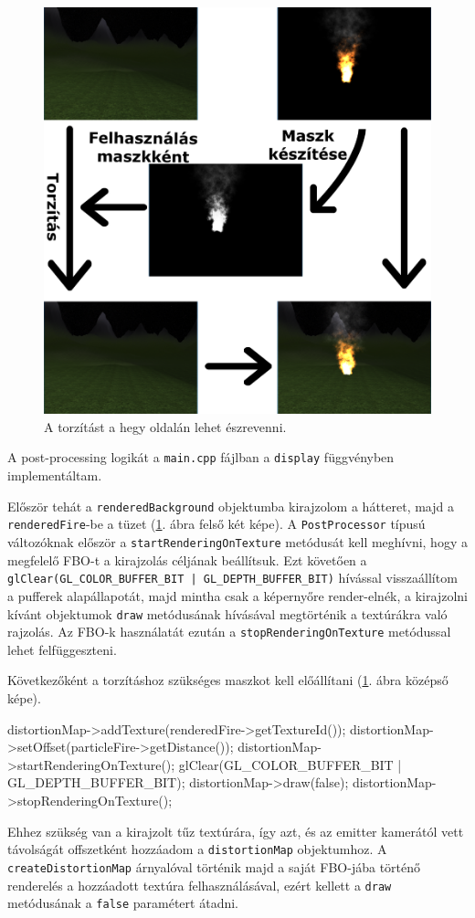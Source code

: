 \begin{figure}[h!]
 \centering
 \includegraphics[width=\textwidth]{kepek/postprocessing.png}
 \caption{A torzítást a hegy oldalán lehet észrevenni.}
 \label{fig:postprocessing}
\end{figure}
A post-processing logikát a \texttt{main.cpp} fájlban a \texttt{display} függvényben implementáltam.

Először tehát a \texttt{renderedBackground} objektumba kirajzolom a hátteret, majd a \texttt{renderedFire}-be a tüzet (\ref{fig:postprocessing}. ábra felső két képe). A \texttt{PostProcessor} típusú változóknak először a \texttt{startRenderingOnTexture} metódusát kell meghívni, hogy a megfelelő FBO-t a kirajzolás céljának beállítsuk. Ezt követően a \texttt{glClear(GL\_COLOR\_BUFFER\_BIT | GL\_DEPTH\_BUFFER\_BIT)} hívással visszaállítom a pufferek alapállapotát, majd mintha csak a képernyőre render-elnék, a kirajzolni kívánt objektumok \texttt{draw} metódusának hívásával megtörténik a textúrákra való rajzolás. Az FBO-k használatát ezután a \texttt{stopRenderingOnTexture} metódussal lehet felfüggeszteni.

Következőként a torzításhoz szükséges maszkot kell előállítani (\ref{fig:postprocessing}. ábra középső képe). 
\begin{cpp}
distortionMap->addTexture(renderedFire->getTextureId());
distortionMap->setOffset(particleFire->getDistance());
distortionMap->startRenderingOnTexture();
glClear(GL_COLOR_BUFFER_BIT | GL_DEPTH_BUFFER_BIT);
distortionMap->draw(false);
distortionMap->stopRenderingOnTexture();
\end{cpp}
Ehhez szükség van a kirajzolt tűz textúrára, így azt, és az emitter kamerától vett távolságát offszetként hozzáadom a \texttt{distortionMap} objektumhoz. A \texttt{createDistortionMap} árnyalóval történik majd a saját FBO-jába történő renderelés a hozzáadott textúra felhasználásával, ezért kellett a \texttt{draw} metódusának a \texttt{false} paramétert átadni. 

